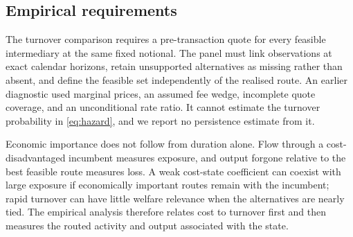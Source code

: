\subsection{Empirical requirements}
\label{sec:survival:obstacle}

The turnover comparison requires a pre-transaction quote for every feasible intermediary at the same fixed notional. The panel must link observations at exact calendar horizons, retain unsupported alternatives as missing rather than absent, and define the feasible set independently of the realised route. An earlier diagnostic used marginal prices, an assumed fee wedge, incomplete quote coverage, and an unconditional rate ratio. It cannot estimate the turnover probability in \eqref{eq:hazard}, and we report no persistence estimate from it.

Economic importance does not follow from duration alone. Flow through a cost-disadvantaged incumbent measures exposure, and output forgone relative to the best feasible route measures loss. A weak cost-state coefficient can coexist with large exposure if economically important routes remain with the incumbent; rapid turnover can have little welfare relevance when the alternatives are nearly tied. The empirical analysis therefore relates cost to turnover first and then measures the routed activity and output associated with the state.
